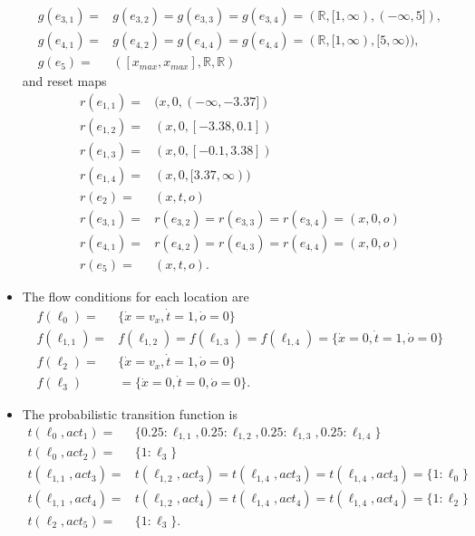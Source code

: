 \begin{ex}
\begin{itemize}
\begin{align*}
            g(e_{3,1})=&g(e_{3,2})=g(e_{3,3})=g(e_{3,4})=(\mathbb{R},[1,\infty),(-\infty,5]), \\
            g(e_{4,1})=&g(e_{4,2})=g(e_{4,4})=g(e_{4,4})=(\mathbb{R},[1,\infty),[5,\infty)), \\
            g(e_{5})=&([x_{max},x_{max}],\mathbb{R},\mathbb{R})
        \end{align*}
        and reset maps
        \begin{align*}
            r(e_{1,1})=&(x,0,(-\infty,-3.37]) \\
            r(e_{1,2})=&(x,0,[-3.38,0.1]) \\
            r(e_{1,3})=&(x,0,[-0.1,3.38]) \\
            r(e_{1,4})=&(x,0,[3.37,\infty)) \\
            r(e_{2})=&(x,t,o) \\
            r(e_{3,1})=&r(e_{3,2})=r(e_{3,3})=r(e_{3,4})=(x,0,o) \\
            r(e_{4,1})=&r(e_{4,2})=r(e_{4,3})=r(e_{4,4})=(x,0,o) \\
            r(e_{5})=&(x,t,o).
        \end{align*}
    \item The flow conditions for each location are
        \begin{align*}
            f(\ell_{0})=&\{\dot{x}=v_{x},\dot{t}=1,\dot{o}=0\} \\
            f(\ell_{1,1})=&f(\ell_{1,2})=f(\ell_{1,3})=f(\ell_{1,4})=\{\dot{x}=0,\dot{t}=1,\dot{o}=0\}\\
            f(\ell_{2})=&\{\dot{x}=v_{x},\dot{t}=1,\dot{o}=0\} \\
            f(\ell_{3})&=\{\dot{x}=0,\dot{t}=0,\dot{o}=0\}.
        \end{align*}
    \item The probabilistic transition function is
        \begin{align*}
            t(\ell_{0},act_{1})=&\{0.25:\ell_{1,1},0.25:\ell_{1,2},0.25:\ell_{1,3},0.25:\ell_{1,4}\} \\
            t(\ell_{0},act_{2})=&\{1:\ell_{3}\} \\
            t(\ell_{1,1},act_{3})=&t(\ell_{1,2},act_{3})=t(\ell_{1,4},act_{3})=t(\ell_{1,4},act_{3})=\{1:\ell_{0}\} \\
            t(\ell_{1,1},act_{4})=&t(\ell_{1,2},act_{4})=t(\ell_{1,4},act_{4})=t(\ell_{1,4},act_{4})=\{1:\ell_{2}\} \\
            t(\ell_{2},act_{5})=&\{1:\ell_{3}\}.

\end{align*}
\end{itemize}
\end{ex}
